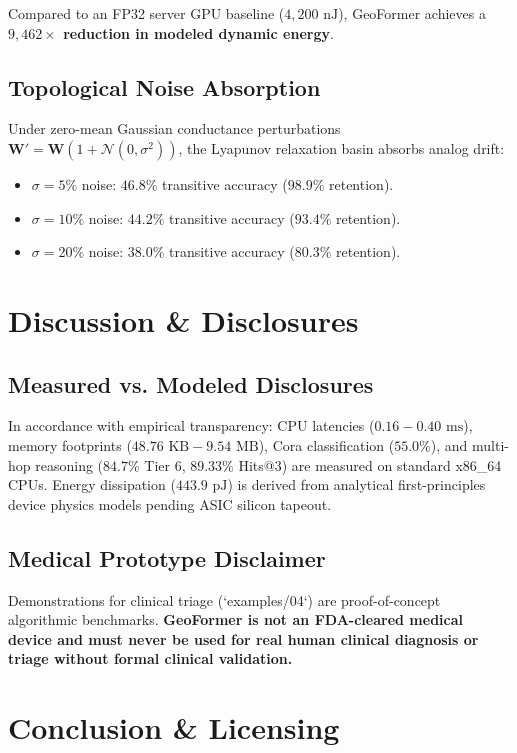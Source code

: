 \documentclass[11pt,a4paper]{article}
\begin{document}
Compared to an FP32 server GPU baseline ($4,200\text{ nJ}$), GeoFormer achieves a \textbf{$9,462\times$ reduction in modeled dynamic energy}.

\subsection{Topological Noise Absorption}
Under zero-mean Gaussian conductance perturbations $\mathbf{W}' = \mathbf{W}(1 + \mathcal{N}(0, \sigma^2))$, the Lyapunov relaxation basin absorbs analog drift:
\begin{itemize}[leftmargin=1.5em]
    \item $\sigma = 5\%$ noise: $46.8\%$ transitive accuracy ($98.9\%$ retention).
    \item $\sigma = 10\%$ noise: $44.2\%$ transitive accuracy ($93.4\%$ retention).
    \item $\sigma = 20\%$ noise: $38.0\%$ transitive accuracy ($80.3\%$ retention).
\end{itemize}

\section{Discussion \& Disclosures}

\subsection{Measured vs. Modeled Disclosures}
In accordance with empirical transparency: CPU latencies ($0.16-0.40\text{ ms}$), memory footprints ($48.76\text{ KB}-9.54\text{ MB}$), Cora classification ($55.0\%$), and multi-hop reasoning ($84.7\%$ Tier 6, $89.33\%$ Hits@3) are measured on standard x86\_64 CPUs. Energy dissipation ($443.9\text{ pJ}$) is derived from analytical first-principles device physics models pending ASIC silicon tapeout.

\subsection{Medical Prototype Disclaimer}
Demonstrations for clinical triage (`examples/04`) are proof-of-concept algorithmic benchmarks. \textbf{GeoFormer is not an FDA-cleared medical device and must never be used for real human clinical diagnosis or triage without formal clinical validation.}

\section{Conclusion \& Licensing}
\end{document}
